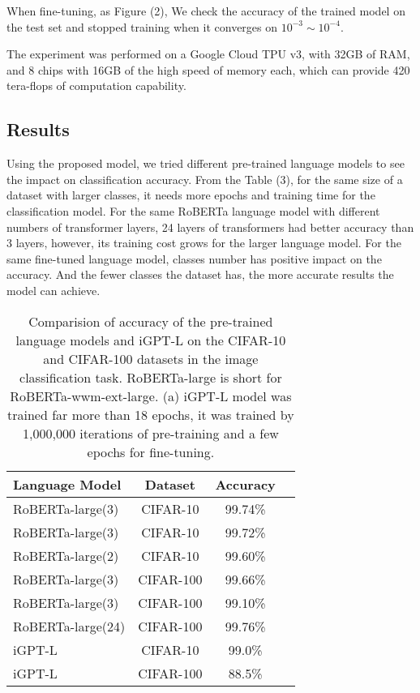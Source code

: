 \documentclass[runningheads]{llncs}
\begin{document}
\par When fine-tuning, as Figure (2), We check the accuracy of the trained model on the test set and stopped training when it converges on $10^{-3}\sim10^{-4}$.

\par The experiment was performed on a Google Cloud TPU v3, with 32GB of RAM, and 8 chips with 16GB of the high speed of memory each,
which can provide 420 tera-flops of computation capability.

\subsection{Results}

Using the proposed model, we tried different pre-trained language models to see the impact on classification accuracy.
From the Table (3), for the same size of a dataset with larger classes, it needs more epochs and training time for the classification model.
For the same RoBERTa language model with different numbers of transformer layers, 24 layers of transformers had better accuracy than 3 layers,
however, its training cost grows for the larger language model.
For the same fine-tuned language model, classes number has positive impact on the accuracy.
And the fewer classes the dataset has, the more accurate results the model can achieve.


\begin{table}
\begin{center}
\begin{tabular}{|l|c|c|r|}
\hline
Language Model 	& Dataset  & Accuracy \\
\hline\hline
RoBERTa-large(3)   & CIFAR-10 	&	99.74\% \\
RoBERTa-large(3)  & CIFAR-10 	&	99.72\% \\
RoBERTa-large(2)  & CIFAR-10 	&	99.60\% \\
\hline
RoBERTa-large(3)    & CIFAR-100 	&	99.66\% \\
RoBERTa-large(3)  & CIFAR-100   & 	99.10\% \\
RoBERTa-large(24) & CIFAR-100  &	99.76\% \\
\hline\hline
iGPT-L & CIFAR-10  & 99.0\% \\
iGPT-L & CIFAR-100 & 88.5\% \\
\hline
\end{tabular}
\end{center}
\caption{Comparision of accuracy of the pre-trained language models and iGPT-L on the CIFAR-10 and CIFAR-100 datasets in the image classification task.
RoBERTa-large is short for RoBERTa-wwm-ext-large. (a) iGPT-L model was trained far more than 18 epochs, it was trained by 1,000,000 iterations of pre-training and a few epochs for fine-tuning.}
\end{table}
\end{document}
